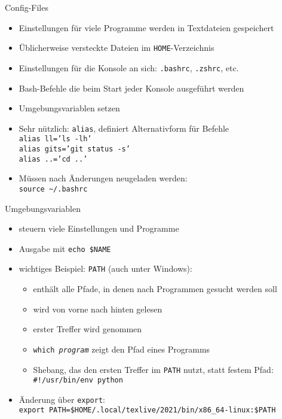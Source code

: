 \begin{frame}{Config-Files}
  \begin{itemize}
    \item Einstellungen für viele Programme werden in Textdateien gespeichert
    \item Üblicherweise versteckte Dateien im \texttt{HOME}-Verzeichnis
    \item Einstellungen für die Konsole an sich: \texttt{.bashrc}, \texttt{.zshrc}, etc.
    \item Bash-Befehle die beim Start jeder Konsole ausgeführt werden
    \item Umgebungsvariablen setzen
    \item Sehr nützlich: \texttt{alias}, definiert Alternativform für Befehle \\
      \texttt{alias ll='ls -lh'} \\
      \texttt{alias gits='git status -s'} \\
      \texttt{alias ..='cd ..'}
    \item Müssen nach Änderungen neugeladen werden:\\
      \texttt{source \textasciitilde/.bashrc}
  \end{itemize}
\end{frame}

\begin{frame}{Umgebungsvariablen}
  \begin{itemize}
    \item steuern viele Einstellungen und Programme
    \item Ausgabe mit \texttt{echo \$NAME}
    \item wichtiges Beispiel: \texttt{PATH} (auch unter Windows):
      \begin{itemize}
        \item enthält alle Pfade, in denen nach Programmen gesucht werden soll
        \item wird von vorne nach hinten gelesen
        \item erster Treffer wird genommen
        \item \texttt{which \textit{program}} zeigt den Pfad eines Programms
        \item Shebang, das den ersten Treffer im \texttt{PATH} nutzt, statt festem Pfad: \texttt{\#!/usr/bin/env python}
      \end{itemize}
    \item Änderung über \texttt{export}:\\
      \texttt{export PATH=\$HOME/.local/texlive/2021/bin/x86\_64-linux:\$PATH}
  \end{itemize} 
\end{frame}


